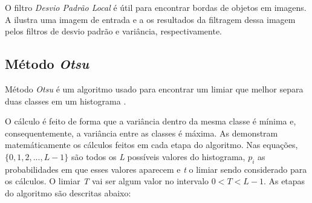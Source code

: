 \par O filtro \textit{Desvio Padrão Local} é útil para encontrar bordas de objetos em imagens. A  ilustra uma imagem de entrada e a  os resultados da filtragem dessa imagem pelos filtros de desvio padrão e variância, respectivamente.




\FloatBarrier

\subsection{Método \textit{Otsu}}\label{sec:dom_esp:otsu}

\par Método \textit{Otsu} é um algoritmo usado para encontrar um limiar que melhor separa duas classes em um histograma \cite{otsumethod}.

\par O cálculo é feito de forma que a variância dentro da mesma classe é mínima e, consequentemente, a variância entre as classes é máxima. As  demonstram matemáticamente os cálculos feitos em cada etapa do algoritmo. Nas equações, $\{0, 1, 2, ..., L - 1\}$ são todos os \textit{L} possíveis valores do histograma, $p_{i}$ as probabilidades em que esses valores aparecem e \textit{t} o limiar sendo considerado para os cálculos. O limiar \textit{T} vai ser algum valor no intervalo $0 < T < L - 1$. As etapas do algoritmo são descritas abaixo:

